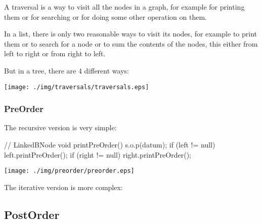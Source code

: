 \documentclass[a4paper, 9pt]{extarticle}
\begin{document}
A traversal is a way to visit all the nodes in a graph, for example for
printing them or for searching or for doing some other operation on them.

In a list, there is only two reasonable ways to visit its nodes,
for example to print them
or to search for a node
or to sum the contents of the nodes,
this either from left to right or from right to left.

But in a tree, there are 4 different ways:



\begin{center}
  \texttt{[image: ./img/traversals/traversals.eps]}
\end{center}


\subsubsection{PreOrder}

The recursive version is very simple:

\begin{multicols}{2}
\begin{blackboard}
// LinkedBNode
void printPreOrder() {
  s.o.p(datum);
  if (left != null) {
    left.printPreOrder();
  }
  if (right != null) {
    right.printPreOrder();
  }
}
\end{blackboard}
\columnbreak
\texttt{[image: ./img/preorder/preorder.eps]}
\end{multicols}

The iterative version is more complex:


\subsection{PostOrder}
\end{document}
